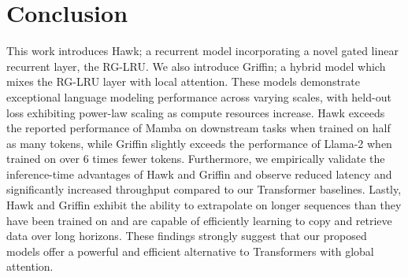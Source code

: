 \section{Conclusion}

This work introduces Hawk; a recurrent model incorporating a novel gated linear recurrent layer, the RG-LRU. We also introduce Griffin; a hybrid model which mixes the RG-LRU layer with local attention. These models demonstrate exceptional language modeling performance across varying scales, with held-out loss exhibiting power-law scaling as compute resources increase. Hawk exceeds the reported performance of Mamba on downstream tasks when trained on half as many tokens, while Griffin slightly exceeds the performance of Llama-2 when trained on over 6 times fewer tokens. Furthermore, we empirically validate the inference-time advantages of Hawk and Griffin and observe reduced latency and significantly increased throughput compared to our Transformer baselines. Lastly, Hawk and Griffin exhibit the ability to extrapolate on longer sequences than they have been trained on and are capable of efficiently learning to copy and retrieve data over long horizons. These findings strongly suggest that our proposed models offer a powerful and efficient alternative to Transformers with global attention.


